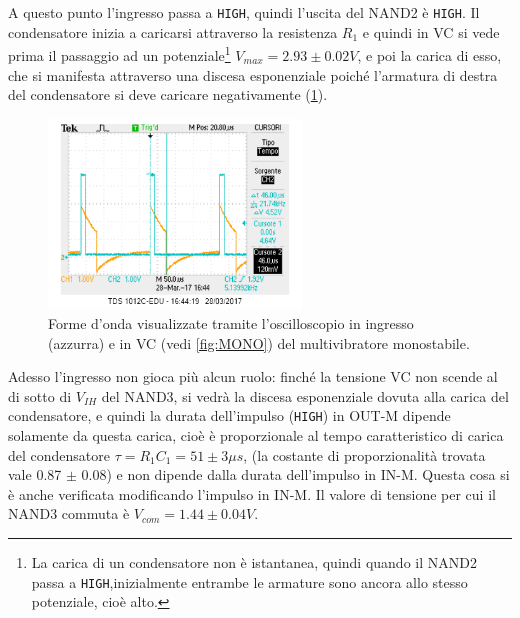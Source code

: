 \documentclass[a4paper,10pt]{article}
\def\code#1{\texttt{#1}}
\begin{document}
A questo punto l'ingresso passa a \code{HIGH}, quindi l'uscita del NAND2 è \code{HIGH}. Il condensatore inizia a caricarsi attraverso la resistenza $R_1$ e quindi in VC si vede prima il passaggio ad un potenziale\footnote{La carica di un condensatore non è istantanea, quindi quando il NAND2 passa a \code{HIGH},inizialmente entrambe le armature sono ancora allo stesso potenziale, cioè alto.} $V_{max} = 2.93\pm 0.02 V$, e poi la carica di esso, che si manifesta attraverso una discesa esponenziale poiché l'armatura di destra del condensatore si deve caricare negativamente (\cref{fig:VC}).

\begin{figure}[H]
	\centering
	\includegraphics[width=0.6\textwidth]{../grafici/monostabileVC.png}
	\caption{Forme d'onda visualizzate tramite l'oscilloscopio in ingresso (azzurra) e in VC (vedi \cref{fig:MONO}) del multivibratore monostabile.}
	\label{fig:VC}
\end{figure}

Adesso l'ingresso non gioca più alcun ruolo: finché la tensione VC non scende al di sotto di $V_{IH}$ del NAND3, si vedrà la discesa esponenziale dovuta alla carica del condensatore, e quindi la durata dell'impulso (\code{HIGH}) in OUT-M dipende solamente da questa carica, cioè è proporzionale al tempo caratteristico di carica del condensatore $\tau = R_1 C_1 = 51 \pm 3 \mu s$, (la costante di proporzionalità trovata vale 0.87 $\pm$ 0.08) e non dipende dalla durata dell'impulso in IN-M. Questa cosa si è anche verificata modificando l'impulso in IN-M. Il valore di tensione per cui il NAND3 commuta è $V_{com} = 1.44\pm 0.04 V$.
\end{document}
